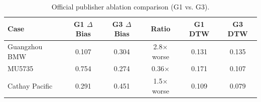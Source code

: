 \begin{table}[t]
\centering
\caption{Official publisher ablation comparison (G1 vs. G3).}
\label{tab:publisher_ablation}
\begin{tabular}{lccccc}
\toprule
Case & G1 $\Delta$Bias & G3 $\Delta$Bias & Ratio & G1 DTW & G3 DTW \\
\midrule
Guangzhou BMW & 0.107 & 0.304 & 2.8$\times$ worse & 0.131 & 0.135 \\
MU5735 & 0.754 & 0.274 & 0.36$\times$ & 0.171 & 0.107 \\
Cathay Pacific & 0.291 & 0.451 & 1.5$\times$ worse & 0.109 & 0.079 \\
\bottomrule
\end{tabular}
\end{table}
